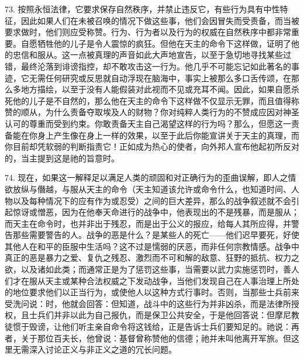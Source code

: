 73. 按照永恒法律，它要求保存自然秩序，并禁止违反它，有些行为具有中性特征，因此如果人们在未被召唤的情况下做这些事，他们会因冒失而受责备，而当被要求做时，他们则应受称赞。行为、行为者以及行为的权威在自然秩序中都非常重要。自愿牺牲他的儿子是令人震惊的疯狂。但他在天主的命令下这样做，证明了他的忠信和服从。这一点被真理的声音如此大声地宣告，以至于急切地寻找某些过错，最终沦落到诽谤指控，却不敢攻击这一行为。他几乎不可能忘记如此著名的事迹，它无需任何研究或反思就自动浮现在脑海中，事实上被那么多口舌传颂，在那么多地方描绘，以至于没有人能假装对此视而不见或充耳不闻。因此，如果自愿杀死他的儿子是不自然的，那么他在天主的命令下这样做不仅显示无罪，而且值得称赞的顺从，为什么责备夺取埃及人的财物？你对纯粹人类行为的不赞成应因对神圣认可的尊重而受到约束。你敢责备天主自己渴望这样的行为吗？那么，但愿这一责备能在你身上产生像在身上一样的效果，以至于此后你能宣讲关于天主的真理，而你目前却凭软弱的判断指责它！正如成为热心的使者，向外邦人宣布他起初所反对的，当主提到这是祂的旨意时。\par

74. 现在，如果这一解释足以满足人类的顽固和对正确行为的歪曲误解，即人之情欲放纵与僭越，与服从天主的命令（天主知道该允许或命令什么，也知道时间、人物以及每种情况下的应有作为或忍受）之间的巨大差异，那么的战争叙述就不会引起惊讶或憎恶，因为在他奉天命进行的战争中，他表现出的不是残暴，而是服从；而天主在命令时，也并非出于残忍，而是出于公义的报应，给每人其所应得，并警告那些需要警告的人。战争的恶是什么？是某些人的死亡——他们迟早要死，好使其他人在和平的臣服中生活吗？这不过是懦弱的厌恶，而非任何宗教情感。战争中真正的恶是暴力之爱、复仇之残忍、激烈而不可和解的敌意、狂野的抵抗、权力之欲，以及诸如此类；而通常正是为了惩罚这些事，当需要以武力实施惩罚时，善人们才在服从天主或某种合法权威之下发动战争，当他们发现自己在人事治理上所处的地位要求他们以正当行为，或使他人以这种方式行事时。否则，当那些士兵前来受洗问说：时，他就会回答：但知道，战斗中的这些行为并非凶杀，而是法律所授权，且士兵们并非以此为自己报仇，而是保卫公共安全，于是他回答说：但摩尼教徒惯于毁谤，让他们听主亲自命令将这钱给，正是告诉士兵们要知足的。祂说：再者，关于那位百夫长，他曾说：基督曾称赞他的信德；祂并未叫他离开军旅。但这里无需深入讨论正义与非正义之道的冗长问题。\par

